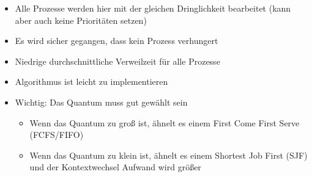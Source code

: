 \documentclass{article}
\begin{document}
\begin{itemize}
    \item Alle Prozesse werden hier mit der gleichen Dringlichkeit bearbeitet (kann aber auch keine Prioritäten setzen)
    \item Es wird sicher gegangen, dass kein Prozess verhungert
    \item Niedrige durchschnittliche Verweilzeit für alle Prozesse
    \item Algorithmus ist leicht zu implementieren
    \item Wichtig: Das Quantum muss gut gewählt sein
          \begin{itemize}
              \item Wenn das Quantum zu groß ist, ähnelt es einem First Come First Serve (FCFS/FIFO)
              \item Wenn das Quantum zu klein ist, ähnelt es einem Shortest Job First (SJF) und der Kontextwechsel Aufwand wird größer
          \end{itemize}
\end{itemize}

\nocite{*}
\printbibliography
\end{document}
